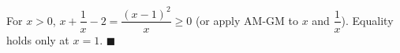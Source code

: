 For $x>0$, $x+\dfrac1x-2=\dfrac{(x-1)^2}x\ge0$ (or apply AM-GM to $x$ and $\dfrac1x$). Equality holds only at $x=1$. $\blacksquare$
